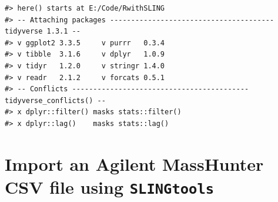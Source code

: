 \documentclass[
  letterpaper,
  DIV=11,
  numbers=noendperiod]{scrreprt}
\begin{document}
\begin{verbatim}
#> here() starts at E:/Code/RwithSLING
#> -- Attaching packages --------------------------------------- tidyverse 1.3.1 --
#> v ggplot2 3.3.5     v purrr   0.3.4
#> v tibble  3.1.6     v dplyr   1.0.9
#> v tidyr   1.2.0     v stringr 1.4.0
#> v readr   2.1.2     v forcats 0.5.1
#> -- Conflicts ------------------------------------------ tidyverse_conflicts() --
#> x dplyr::filter() masks stats::filter()
#> x dplyr::lag()    masks stats::lag()
\end{verbatim}

\hypertarget{import-an-agilent-masshunter-csv-file-using-slingtools}{%
\section{\texorpdfstring{Import an Agilent MassHunter CSV file using
\texttt{SLINGtools}}{Import an Agilent MassHunter CSV file using SLINGtools}}\label{import-an-agilent-masshunter-csv-file-using-slingtools}}
\end{document}
